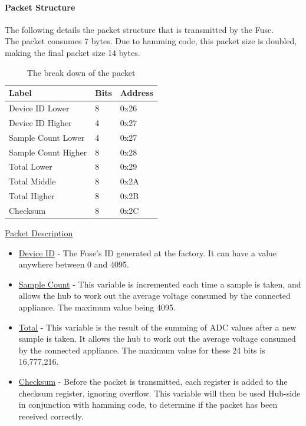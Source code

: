 \documentclass[draft,preprint,12pt,3p]{elsarticle}
\begin{document}
\paragraph{Packet Structure}
The following details the packet structure that is transmitted by the Fuse.\\
The packet consumes 7 bytes. Due to hamming code, this packet size is doubled, making the final packet size 14 bytes.\\[5pt]
\begin{table}[H]
\centering
\resizebox{8cm}{!} {%
    \centering
    \begin{tabular}{| l | l | p{2cm} |}
    \hline
    Label & Bits &  Address \\ \hline
    Device ID Lower & 8 & 0x26\\ \hline
    Device ID Higher & 4 & 0x27\\ \hline
    Sample Count Lower & 4 & 0x27\\ \hline
    Sample Count Higher & 8 & 0x28\\ \hline
    Total Lower & 8 & 0x29\\ \hline
    Total Middle & 8 & 0x2A\\ \hline
    Total Higher & 8 & 0x2B\\ \hline
    Checksum & 8 & 0x2C\\ \hline
    \end{tabular}
}
\caption{The break down of the packet}
\label{tab:packet}
\end{table}
\underline{Packet Description}
\begin{itemize}
\item \underline{Device ID} - The Fuse's ID generated at the factory. It can have a value anywhere between 0 and 4095.
\item \underline{Sample Count} - This variable is incremented each time a sample is taken, and allows the hub to work out the average voltage consumed by the connected appliance. The maximum value being 4095.
\item \underline{Total} - This variable is the result of the summing of ADC values after a new sample is taken. It allows the hub to work out the average voltage consumed by the connected appliance. The maximum value for these 24 bits is 16,777,216.
\item \underline{Checksum} - Before the packet is transmitted, each register is added to the checksum register, ignoring overflow. This variable will then be used Hub-side in conjunction with hamming code, to determine if the packet has been received correctly.
\end{itemize}
\end{document}

